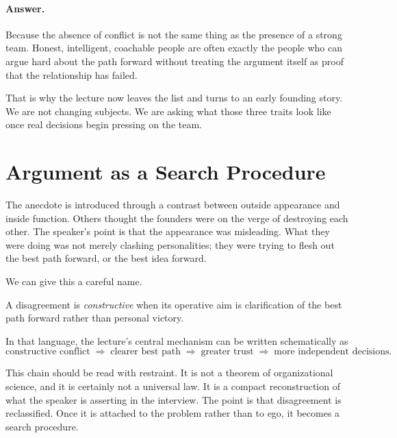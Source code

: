 \paragraph{Answer.} Because the absence of conflict is not the same thing as the presence of a strong team. Honest, intelligent, coachable people are often exactly the people who can argue hard about the path forward without treating the argument itself as proof that the relationship has failed.

That is why the lecture now leaves the list and turns to an early founding story. We are not changing subjects. We are asking what those three traits look like once real decisions begin pressing on the team.

\section{Argument as a Search Procedure}

The anecdote is introduced through a contrast between outside appearance and inside function. Others thought the founders were on the verge of destroying each other. The speaker's point is that the appearance was misleading. What they were doing was not merely clashing personalities; they were trying to flesh out the best path forward, or the best idea forward.

We can give this a careful name.

\begin{definition}
A disagreement is \emph{constructive} when its operative aim is clarification of the best path forward rather than personal victory.
\end{definition}

In that language, the lecture's central mechanism can be written schematically as
\begin{equation}
\text{constructive conflict}
\;\Rightarrow\;
\text{clearer best path}
\;\Rightarrow\;
\text{greater trust}
\;\Rightarrow\;
\text{more independent decisions}.
\end{equation}

This chain should be read with restraint. It is not a theorem of organizational science, and it is certainly not a universal law. It is a compact reconstruction of what the speaker is asserting in the interview. The point is that disagreement is reclassified. Once it is attached to the problem rather than to ego, it becomes a search procedure.


